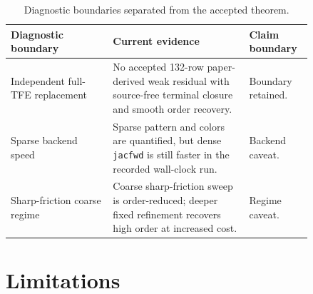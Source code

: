 \documentclass[preprint,12pt]{elsarticle}
\newcommand{\tfe}{TFE}
\begin{document}
\begin{table}[htbp]
\centering
\caption{Diagnostic boundaries separated from the accepted theorem.}
\label{tab:diagnostic-boundaries}
\begin{tabular}{P{0.30\linewidth}P{0.40\linewidth}P{0.14\linewidth}}
\toprule
Diagnostic boundary & Current evidence & Claim boundary \\
\midrule
Independent full-\tfe{} replacement &
No accepted 132-row paper-derived weak residual with source-free terminal
closure and smooth order recovery. &
Boundary retained. \\
Sparse backend speed &
Sparse pattern and colors are quantified, but dense \texttt{jacfwd} is still
faster in the recorded wall-clock run. &
Backend caveat. \\
Sharp-friction coarse regime &
Coarse sharp-friction sweep is order-reduced; deeper fixed refinement recovers
high order at increased cost. &
Regime caveat. \\
\bottomrule
\end{tabular}
\end{table}

\section{Limitations}
\end{document}
